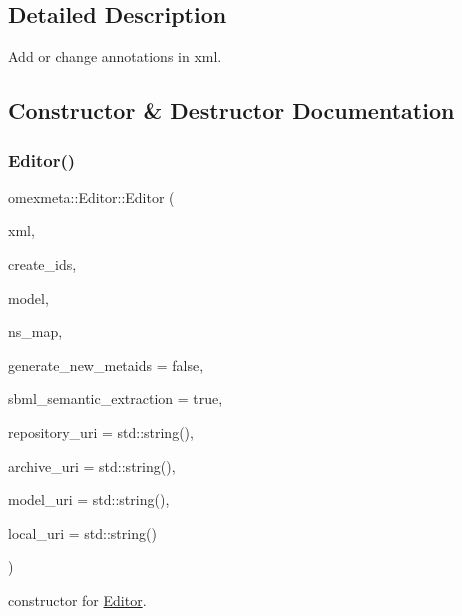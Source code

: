 \subsection{Detailed Description}
Add or change annotations in xml. 

\subsection{Constructor \& Destructor Documentation}
\mbox{\label{classomexmeta_1_1Editor_a6ac976c1a3762f77a577b5735cd509f4}} 
\subsubsection{\texorpdfstring{Editor()}{Editor()}}
{\footnotesize\ttfamily omexmeta\+::\+Editor\+::\+Editor (\begin{DoxyParamCaption}\item[{const std\+::string \&}]{xml,  }\item[{bool}]{create\+\_\+ids,  }\item[{const \hyperlink{classredland_1_1LibrdfModel}{Librdf\+Model} \&}]{model,  }\item[{Namespace\+Map \&}]{ns\+\_\+map,  }\item[{bool}]{generate\+\_\+new\+\_\+metaids = {\ttfamily false},  }\item[{bool}]{sbml\+\_\+semantic\+\_\+extraction = {\ttfamily true},  }\item[{const std\+::string \&}]{repository\+\_\+uri = {\ttfamily std\+:\+:string()},  }\item[{const std\+::string \&}]{archive\+\_\+uri = {\ttfamily std\+:\+:string()},  }\item[{const std\+::string \&}]{model\+\_\+uri = {\ttfamily std\+:\+:string()},  }\item[{const std\+::string \&}]{local\+\_\+uri = {\ttfamily std\+:\+:string()} }\end{DoxyParamCaption})\hspace{0.3cm}{\ttfamily [explicit]}}



constructor for \hyperlink{classomexmeta_1_1Editor}{Editor}. 


